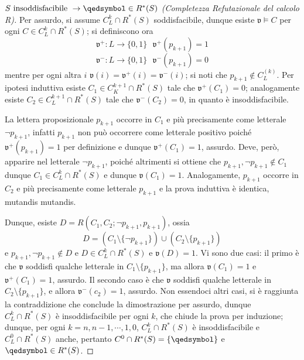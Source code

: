 \begin{proof}[$S \text{ insoddisfacibile } \rightarrow \qedsymbol \in R^*(S)$ (Completezza Refutazionale del calcolo R)]
        Per assurdo, si assume $C^k_L \cap R^*(S)$ 
        soddisfacibile, dunque esiste $\mathfrak{v} \models C$ per ogni 
        $C \in C^k_L \cap R^*(S)$; si definiscono ora 
        $$
        \mathfrak{v}^+ : L \rightarrow \{0,1\} ~ ~ ~ \mathfrak{v}^+(p_{k+1}) = 1 
        $$
        $$
        \mathfrak{v}^- : L \rightarrow \{0,1\} ~ ~ ~ \mathfrak{v}^-(p_{k+1}) = 0
        $$
        mentre per ogni altra $i$ $\mathfrak{v}(i) = \mathfrak{v}^+(i) = \mathfrak{v}^-(i)$;
        si noti che $p_{k+1} \notin C^{(k)}_L$. 
        Per ipotesi induttiva esiste $C_1 \in C^{k+1}_K \cap R^*(S)$ tale che 
        $\mathfrak{v}^+(C_1) = 0$; analogamente esiste $C_2 \in C^{k+1}_L \cap R^*(S)$ 
        tale che $\mathfrak{v}^-(C_2) = 0$, in quanto è insoddisfacibile.
       
        La lettera proposizionale $p_{k+1}$ occorre in $C_1$ e più precisamente come 
        letterale $\neg p_{k+1}$, infatti $p_{k+1}$ non può occorrere come letterale 
        positivo poiché $\mathfrak{v}^+(p_{k+1}) =1$ per definizione e dunque $ \mathfrak{v}^+(C_1) = 1$, 
        assurdo. Deve, però, apparire nel letterale $\neg p_{k+1}$, poiché altrimenti 
        si ottiene che $p_{k+1}, \neg p_{k+1} \notin C_1$ dunque $C_1 \in C^k_L \cap R^*(S)$ 
        e dunque $\mathfrak{v}(C_1) = 1$. Analogamente, 
        $p_{k+1}$ occorre in $C_2$ e più precisamente come letterale $p_{k+1}$ 
        e la prova induttiva è identica, mutandis mutandis. 


        Dunque, esiste $D = R(C_1, C_2; \neg p_{k+1}, p_{k+1})$, ossia 
        $$
        D = (C_1 \setminus \{ \neg p_{k+1}\}) \cup (C_2 \setminus \{p_{k+1}\})
        $$
        e $p_{k+1}, \neg p_{k+1} \notin D$ e $D \in C^{k}_L \cap R^*(S)$ 
        e $\mathfrak{v}(D) = 1$. Vi sono due casi: il primo è che 
        $\mathfrak{v}$ soddisfi qualche letterale in $C_1 \setminus \{p_{k+1}\}$, 
        ma allora $\mathfrak{v}(C_1)  = 1$ e $\mathfrak{v}^+(C_1) = 1$, 
        assurdo.
        Il secondo caso è che $\mathfrak{v}$ soddisfi qualche letterale 
        in $C_2 \setminus \{p_{k+1}\}$, e allora $\mathfrak{v}^-(c_2) = 1$, 
        assurdo.
        Non essendoci altri casi, si è raggiunta la contraddizione 
        che conclude la dimostrazione per assurdo, dunque 
        $C^k_L \cap R^*(S)$ è
        insoddisfacibile per ogni $k$, che chiude la prova per induzione; dunque, 
        per ogni $k = n, n-1, \cdots, 1, 0$, $C^k_L \cap R^*(S)$ è 
        insoddisfacibile e $C^0_L \cap R^*(S)$ anche, pertanto 
        $C^0\cap R^*(S) = \{\qedsymbol\}$ e $\qedsymbol \in R^*(S)$.
\end{proof}
